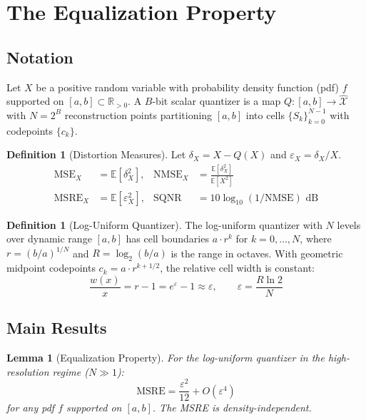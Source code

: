 \documentclass[11pt,letterpaper]{article}
\newtheorem{lemma}[theorem]{Lemma}
\theoremstyle{definition}
\newtheorem{definition}[theorem]{Definition}
\theoremstyle{remark}
\newcommand{\NMSE}{\mathrm{NMSE}}
\newcommand{\MSRE}{\mathrm{MSRE}}
\newcommand{\MSE}{\mathrm{MSE}}
\newcommand{\SQNR}{\mathrm{SQNR}}
\newcommand{\E}{\mathbb{E}}
\newcommand{\R}{\mathbb{R}}
\begin{document}
\section{The Equalization Property}
\label{sec:equalization}

\subsection{Notation}

Let $X$ be a positive random variable with probability density function (pdf)
$f$ supported on $[a,b] \subset \R_{>0}$.
A $B$-bit scalar quantizer is a map $Q: [a,b] \to \hat{\mathcal{X}}$ with
$N = 2^B$ reconstruction points partitioning $[a,b]$ into cells
$\{S_k\}_{k=0}^{N-1}$ with codepoints $\{c_k\}$.

\begin{definition}[Distortion Measures]
\label{def:distortion}
Let $\delta_X = X - Q(X)$ and $\varepsilon_X = \delta_X / X$.
\begin{align}
  \MSE_X &= \E[\delta_X^2],
  & \NMSE_X &= \frac{\E[\delta_X^2]}{\E[X^2]}
    \label{eq:nmse-def} \\
  \MSRE_X &= \E[\varepsilon_X^2],
  & \SQNR &= 10\log_{10}(1/\NMSE) \text{ dB}
    \label{eq:sqnr-def}
\end{align}
\end{definition}

\begin{definition}[Log-Uniform Quantizer]
\label{def:log-uniform}
The log-uniform quantizer with $N$ levels over dynamic range $[a,b]$ has
cell boundaries $a \cdot r^k$ for $k = 0, \ldots, N$, where
$r = (b/a)^{1/N}$ and $R = \log_2(b/a)$ is the range in octaves.
With geometric midpoint codepoints $c_k = a \cdot r^{k+1/2}$, the relative
cell width is constant:
\begin{equation}
  \frac{w(x)}{x} = r - 1 = e^\varepsilon - 1 \approx \varepsilon,
  \qquad \varepsilon = \frac{R \ln 2}{N}
  \label{eq:rel-cell-width}
\end{equation}
\end{definition}

\subsection{Main Results}

\begin{lemma}[Equalization Property]
\label{lem:equalization}
For the log-uniform quantizer in the high-resolution regime ($N \gg 1$):
\[
  \MSRE = \frac{\varepsilon^2}{12} + O(\varepsilon^4)
\]
for \emph{any} pdf $f$ supported on $[a,b]$.
The MSRE is density-independent.
\end{lemma}
\end{document}

